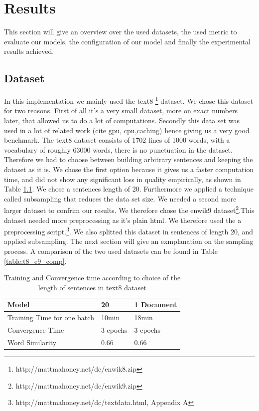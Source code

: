 
\chapter{Results}\label{chap:results}



This section will give an overview over the used datasets, the used metric to evaluate our models, the configuration of our model and finally the experimental results achieved.

\section{Dataset}\label{sec:dataset}
In this implementation we mainly used the text8 \footnote{http://mattmahoney.net/dc/enwik8.zip} dataset. We chose this dataset for two reasons. First of all it's a very small dataset, more on exact numbers later, that allowed us to do a lot of computations. Secondly this data set was used in a lot of related work (cite gpu, cpu,caching) hence giving us a very good benchmark. The text8 dataset consists of 1702 lines of 1000 words, with a vocabulary of roughly 63000 words, there is no punctuation in the dataset. Therefore we had to choose between building arbitrary sentences and keeping the dataset as it is. We chose the first option because it gives us a faster computation time, and did not show any significant loss in quality empirically, as shown in Table \ref{table:with_20}. We chose a sentences length of 20. Furthermore we applied a technique called subsampling that reduces the data set size. 
We needed a second more larger dataset to confrim our results.  We therefore chose the enwik9 dataset\footnote{http://mattmahoney.net/dc/enwik9.zip}.This dataset needed more preprocessing as it's plain html. We therefore used the a preprocessing script.\footnote{http://mattmahoney.net/dc/textdata.html, Appendix A}. We also splitted this dataset in sentences of length 20, and applied subsampling. The next section will give an exmplanation on the sampling process. A comparison of the two used datasets can be found in Table \ref{table:t8_e9_comp}.
\begin{table}[]
\centering
\begin{tabular}{|l|l|l|}
\hline
Model            & 20       & 1 Document \\ \hline
Training Time for one batch  & 10min    & 18min      \\ \hline
Convergence Time & 3 epochs & 3 epochs   \\ \hline
Word Similarity  & 0.66     & 0.66       \\ \hline
\end{tabular}
\caption{Training and Convergence time according to choice of the length of sentences in text8 dataset}
    \label{table:with_20}
\end{table}


